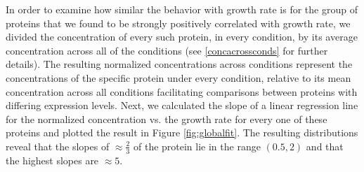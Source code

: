 In order to examine how similar the behavior with growth rate is for the group of proteins that we found to be strongly positively correlated with growth rate, we divided the concentration of every such protein, in every condition, by its average concentration across all of the conditions (see \ref{concacrossconds} for further details).
The resulting normalized concentrations across conditions represent the concentrations of the specific protein under every condition, relative to its mean concentration across all conditions facilitating comparisons between proteins with differing expression levels.
Next, we calculated the slope of a linear regression line for the normalized concentration vs. the growth rate for every one of these proteins and plotted the result in Figure \ref{fig:globalfit}.
The resulting distributions reveal that the slopes of $\approx \frac{2}{3}$ of the protein lie in the range $(0.5,2)$ and that the highest slopes are $\approx 5$.